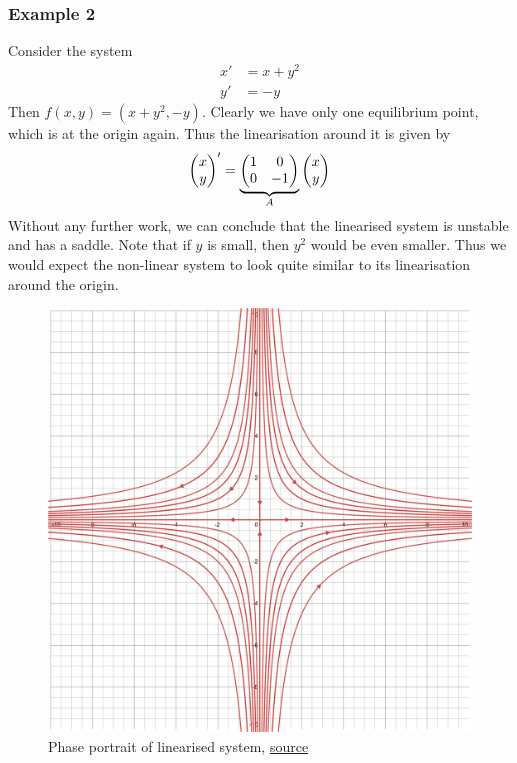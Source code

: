 \subsubsection{Example 2}
Consider the system
\begin{align*}
    x' &= x + y^2\\
    y' &= -y
\end{align*}
Then $f(x, y) = (x + y^2, -y)$. Clearly we have only one equilibrium point, which is at the origin again. Thus the linearisation around it is given by
$$ \begin{pmatrix} x\\y \end{pmatrix}' = \underbrace{\begin{pmatrix} 1 & 0\\0 & -1 \end{pmatrix}}_A \begin{pmatrix} x\\y \end{pmatrix} $$
Without any further work, we can conclude that the linearised system is unstable and has a saddle. Note that if $y$ is small, then $y^2$ would be even smaller. Thus we would expect the non-linear system to look quite similar to its linearisation around the origin.

\begin{figure}[h]
    \centering
    \includegraphics[scale=0.17]{Images/linearisation_eg1.png}
    \caption{Phase portrait of linearised system, \href{https://www.desmos.com/calculator/jqmz5jddc4}{source}}
    \label{fig:linearisation-eg1}
\end{figure}

